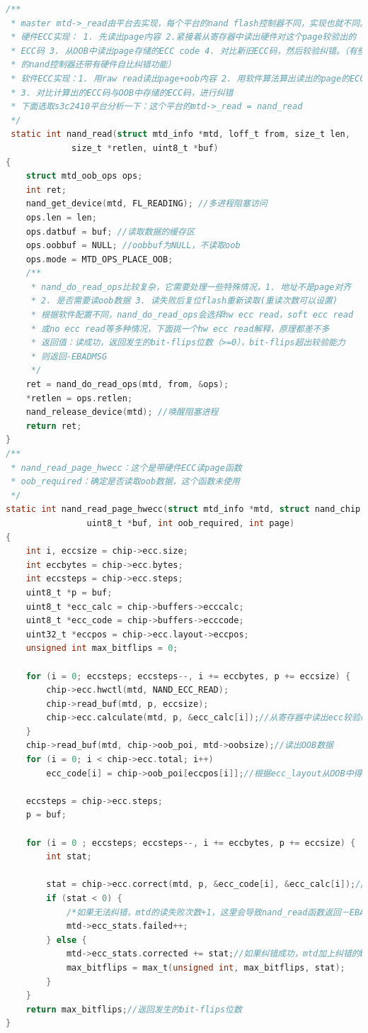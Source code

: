 \begin{lstlisting}[language=C]
/**
 * master mtd->_read由平台去实现，每个平台的nand flash控制器不同，实现也就不同。
 * 硬件ECC实现： 1. 先读出page内容 2.紧接着从寄存器中读出硬件对这个page较验出的
 * ECC码 3. 从OOB中读出page存储的ECC code 4. 对比新旧ECC码，然后较验纠错。（有些平台
 * 的nand控制器还带有硬件自比纠错功能）
 * 软件ECC实现：1. 用raw read读出page+oob内容 2. 用软件算法算出读出的page的ECC码
 * 3. 对比计算出的ECC码与OOB中存储的ECC码，进行纠错
 * 下面选取s3c2410平台分析一下：这个平台的mtd->_read = nand_read
 */
 static int nand_read(struct mtd_info *mtd, loff_t from, size_t len,
		     size_t *retlen, uint8_t *buf)
{
	struct mtd_oob_ops ops;
	int ret;
	nand_get_device(mtd, FL_READING); //多进程阻塞访问
	ops.len = len;
	ops.datbuf = buf; //读取数据的缓存区
	ops.oobbuf = NULL; //oobbuf为NULL，不读取oob
	ops.mode = MTD_OPS_PLACE_OOB;
	/**
	 * nand_do_read_ops比较复杂，它需要处理一些特殊情况，1. 地址不是page对齐
	 * 2. 是否需要读oob数据 3. 读失败后复位flash重新读取(重读次数可以设置)
	 * 根据软件配置不同，nand_do_read_ops会选择hw ecc read，soft ecc read
	 * 或no ecc read等多种情况，下面挑一个hw ecc read解释，原理都差不多
	 * 返回值：读成功，返回发生的bit-flips位数（>=0），bit-flips超出较验能力
	 * 则返回-EBADMSG
	 */
	ret = nand_do_read_ops(mtd, from, &ops);
	*retlen = ops.retlen;
	nand_release_device(mtd); //唤醒阻塞进程
	return ret;
}
/**
 * nand_read_page_hwecc：这个是带硬件ECC读page函数
 * oob_required：确定是否读取oob数据，这个函数未使用
 */
static int nand_read_page_hwecc(struct mtd_info *mtd, struct nand_chip *chip,
				uint8_t *buf, int oob_required, int page)
{
	int i, eccsize = chip->ecc.size;
	int eccbytes = chip->ecc.bytes;
	int eccsteps = chip->ecc.steps;
	uint8_t *p = buf;
	uint8_t *ecc_calc = chip->buffers->ecccalc;
	uint8_t *ecc_code = chip->buffers->ecccode;
	uint32_t *eccpos = chip->ecc.layout->eccpos;
	unsigned int max_bitflips = 0;

	for (i = 0; eccsteps; eccsteps--, i += eccbytes, p += eccsize) {
		chip->ecc.hwctl(mtd, NAND_ECC_READ);
		chip->read_buf(mtd, p, eccsize);
		chip->ecc.calculate(mtd, p, &ecc_calc[i]);//从寄存器中读出ecc较验码（new）
	}
	chip->read_buf(mtd, chip->oob_poi, mtd->oobsize);//读出OOB数据
	for (i = 0; i < chip->ecc.total; i++)
		ecc_code[i] = chip->oob_poi[eccpos[i]];//根据ecc_layout从OOB中得到ecc较验码（old）

	eccsteps = chip->ecc.steps;
	p = buf;

	for (i = 0 ; eccsteps; eccsteps--, i += eccbytes, p += eccsize) {
		int stat;

		stat = chip->ecc.correct(mtd, p, &ecc_code[i], &ecc_calc[i]);//开始ECC纠错计算
		if (stat < 0) {
			/*如果无法纠错，mtd的读失败次数+1，这里会导致nand_read函数返回－EBADMSG*/
			mtd->ecc_stats.failed++;
		} else {
			mtd->ecc_stats.corrected += stat;//如果纠错成功，mtd加上纠错的bit-flip位数
			max_bitflips = max_t(unsigned int, max_bitflips, stat);
		}
	}
	return max_bitflips;//返回发生的bit-flips位数
}


\end{lstlisting}
